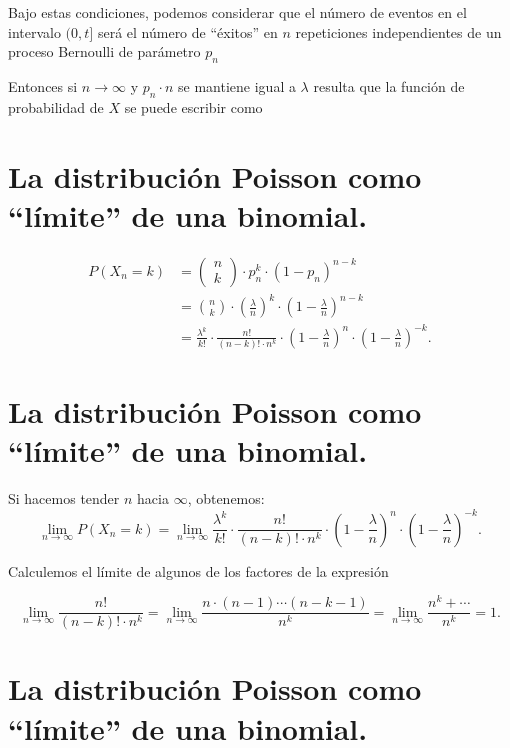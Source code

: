 \documentclass[
  letterpaper,
  DIV=11,
  numbers=noendperiod]{scrreprt}
\begin{document}
Bajo estas condiciones, podemos considerar que el número de eventos en
el intervalo \((0,t]\) será el número de ``éxitos'' en \(n\)
repeticiones independientes de un proceso Bernoulli de parámetro \(p_n\)

Entonces si \(n\to\infty\) y \(p_n\cdot n\) se mantiene igual a
\(\lambda\) resulta que la función de probabilidad de \(X\) se puede
escribir como

\section{La distribución Poisson como ``límite'' de una
binomial.}\label{la-distribuciuxf3n-poisson-como-luxedmite-de-una-binomial.-2}

\[
\begin{array}{rl}
P(X_n=k)&=\left(\begin{array}{c} n\\ k\end{array}\right) \cdot p_n^k\cdot  (1-p_n)^{n-k}
\\
&= {n\choose k}\cdot \left(\frac{\lambda}{n}\right)^{k}\cdot \left(1-\frac{\lambda}{n}\right)^{n-k}\\
&=
\frac{\lambda^k}{k!}\cdot\frac{n!}{(n-k)!\cdot n^k}\cdot
\left(1-\frac{\lambda}{n}\right)^{n}\cdot \left(1-\frac{\lambda}{n}\right)^{-k}.
\end{array}
\]

\section{La distribución Poisson como ``límite'' de una
binomial.}\label{la-distribuciuxf3n-poisson-como-luxedmite-de-una-binomial.-3}

Si hacemos tender \(n\) hacia \(\infty\), obtenemos: \[
\lim_{n\to \infty} P(X_n=k) = \lim_{n\to \infty} \frac{\lambda^k}{k!}\cdot\frac{n!}{(n-k)!\cdot n^k} \cdot
\left(1-\frac{\lambda}{n}\right)^{n}\cdot \left(1-\frac{\lambda}{n}\right)^{-k}.
\]

Calculemos el límite de algunos de los factores de la expresión

\[
\displaystyle\lim_{n\to \infty}\frac{n!}{(n-k)!\cdot n^k}= \lim_{n\to \infty}\frac{n\cdot (n-1)\cdots (n-k-1)}{n^k}
=\lim_{n\to \infty}\frac{n^{k}+\cdots}{n^k}=1.
\]

\section{La distribución Poisson como ``límite'' de una
binomial.}\label{la-distribuciuxf3n-poisson-como-luxedmite-de-una-binomial.-4}
\end{document}
